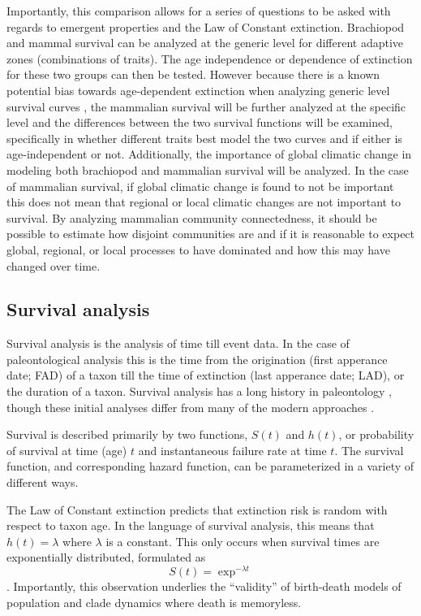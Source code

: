 \documentclass[12pt,letterpaper]{article}
\begin{document}
Importantly, this comparison allows for a series of questions to be asked with regards to emergent properties and the Law of Constant extinction. Brachiopod and mammal survival can be analyzed at the generic level for different adaptive zones (combinations of traits). The age independence or dependence of extinction for these two groups can then be tested. However because there is a known potential bias towards age-dependent extinction when analyzing generic level survival curves \citep{Simpson2006,Raup1978,Raup1991a}, the mammalian survival will be further analyzed at the specific level and the differences between the two survival functions will be examined, specifically in whether different traits best model the two curves and if either is age-independent or not. Additionally, the importance of global climatic change in modeling both brachiopod and  mammalian survival will be analyzed. In the case of mammalian survival, if global climatic change is found to not be important this does not mean that regional or local climatic changes are not important to survival. By analyzing mammalian community connectedness, it should be possible to estimate how disjoint communities are and if it is reasonable to expect global, regional, or local processes to have dominated and how this may have changed over time.

\subsection{Survival analysis}
Survival analysis is the analysis of time till event data. In the case of paleontological analysis this is the time from the origination (first apperance date; FAD) of a taxon till the time of extinction (last apperance date; LAD), or the duration of a taxon. Survival analysis has a long history in paleontology \citep{Simpson1944,VanValen1973}, though these initial analyses differ from many of the modern approaches \citep{Kleinbaum2005}.

Survival is described primarily by two functions, \(S(t)\) and \(h(t)\), or probability of survival at time (age) \(t\) and instantaneous failure rate at time \(t\). The survival function, and corresponding hazard function, can be parameterized in a variety of different ways. 

The Law of Constant extinction \citep{VanValen1973} predicts that extinction risk is random with respect to taxon age. In the language of survival analysis, this means that \(h(t) = \lambda\) where \(\lambda\) is a constant. This only occurs when survival times are exponentially distributed, formulated as 
\begin{equation}
  S(t) = \exp ^{- \lambda t}
  \label{eq:expsurv}
\end{equation}. Importantly, this observation underlies the ``validity'' of birth-death models of population and clade dynamics where death is memoryless.
\end{document}
